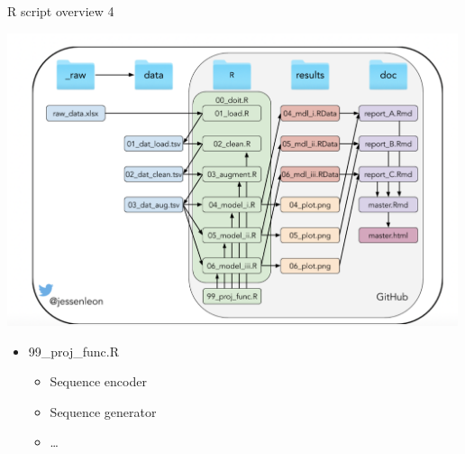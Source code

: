 \documentclass[ignorenonframetext,]{beamer}
\providecommand{\tightlist}{%
  \setlength{\itemsep}{0pt}\setlength{\parskip}{0pt}}
\begin{document}
\begin{frame}{R script overview 4}
\protect\hypertarget{r-script-overview-4}{}

\includegraphics[width=5.20833in,height=\textheight]{project_organisation.png}

\begin{itemize}
\tightlist
\item
  99\_proj\_func.R

  \begin{itemize}
  \tightlist
  \item
    Sequence encoder
  \item
    Sequence generator
  \item
    \ldots{}
  \end{itemize}
\end{itemize}

\end{frame}
\end{document}
